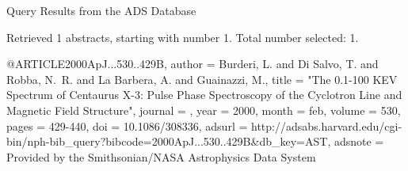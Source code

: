 Query Results from the ADS Database


Retrieved 1 abstracts, starting with number 1.  Total number selected: 1.

@ARTICLE{2000ApJ...530..429B,
   author = {{Burderi}, L. and {Di Salvo}, T. and {Robba}, N.~R. and {La Barbera}, A. and 
	{Guainazzi}, M.},
    title = "{The 0.1-100 KEV Spectrum of Centaurus X-3: Pulse Phase Spectroscopy of the Cyclotron Line and Magnetic Field Structure}",
  journal = {\apj},
     year = 2000,
    month = feb,
   volume = 530,
    pages = {429-440},
      doi = {10.1086/308336},
   adsurl = {http://adsabs.harvard.edu/cgi-bin/nph-bib_query?bibcode=2000ApJ...530..429B&db_key=AST},
  adsnote = {Provided by the Smithsonian/NASA Astrophysics Data System}
}


